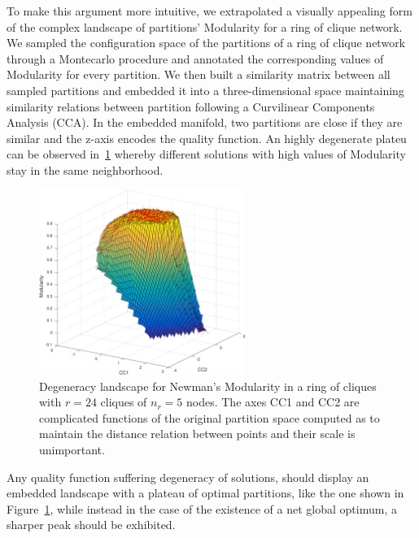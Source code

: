 To make this argument more intuitive, we extrapolated a visually appealing form of the complex landscape of partitions' Modularity for a ring of clique network. We sampled the configuration space of the partitions of a ring of clique network through a Montecarlo procedure and annotated the corresponding values of Modularity for every partition.
We then built a similarity matrix between all sampled partitions and embedded it into a three-dimensional space maintaining similarity relations between partition following a Curvilinear Components Analysis (CCA).
In the embedded manifold, two partitions are close if they are similar and the z-axis encodes the quality function.
An highly degenerate plateu can be observed in~\ref{fig:degeneracylandscape} whereby different solutions with high values of Modularity stay in the same neighborhood.

\begin{figure}[htb!]
\centering
\includegraphics[width=0.6\textwidth]{images/degeneracy_modularity.pdf}
\caption{Degeneracy landscape for Newman's Modularity in a ring of cliques with $r=24$ cliques of $n_r=5$ nodes. The axes CC1 and CC2 are complicated functions of the original partition space computed as to maintain the distance relation between points and their scale is unimportant.}
\label{fig:degeneracylandscape}
\end{figure}

Any quality function suffering degeneracy of solutions, should display an embedded landscape with a plateau of optimal partitions, like the one shown in Figure~\ref{fig:degeneracylandscape}, while instead in the case of the existence of a net global optimum, a sharper peak should be exhibited.